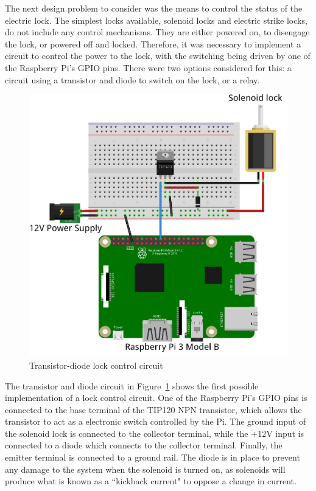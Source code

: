 \documentclass[12pt]{report}
\begin{document}

The next design problem to consider was the means to control the status of the electric lock. The simplest locks 
available, solenoid locks and electric strike locks, do not include any control mechanisms. They are either powered on, 
to disengage the lock, or powered off and locked. Therefore, it was necessary to implement a circuit to control the
power to the lock, with the switching being driven by one of the Raspberry Pi's GPIO pins. There were two options
considered for this: a circuit using a transistor and diode to switch on the lock, or a relay.

\begin{figure}
    \includegraphics[width=\textwidth]{Diagrams/Hardware-Diagrams/diode_transistor_circuit}
    \caption{Transistor-diode lock control circuit}
    \label{fig:transistor-diode-circuit-diagram}
\end{figure}

The transistor and diode circuit in Figure~\ref{fig:transistor-diode-circuit-diagram} shows the first possible 
implementation of a lock control circuit. One of the Raspberry Pi's GPIO pins is connected to the base terminal of the 
TIP120 NPN transistor, which allows the transistor to act as a electronic switch controlled by the Pi. The ground 
input of the solenoid lock is connected to the collector terminal, while the +12V input is connected to a diode which 
connects to the collector terminal. Finally, the emitter terminal is connected to a ground rail. The diode is in place 
to prevent any damage to the system when the solenoid is turned on, as solenoids will produce what is known as a
``kickback current" to oppose a change in current. %
\end{document}
